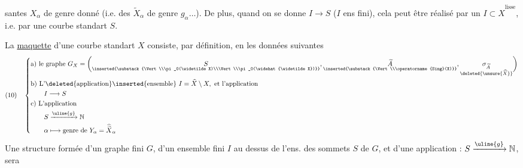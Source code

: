 santes $X_\alpha$ de genre  donné (i.e. des $\widetilde X_\alpha$ de genre $g_\alpha\ldots$). De plus, quand on se donne  $I\to S$ ($I$ ens fini), cela peut être réalisé par un $I\subset\widehat X^{\mathrm{lisse}}$, i.e. par une courbe standart $S$.

La \uline{maquette} d'une courbe standart $X$ consiste, par définition, en les données suivantes
\[
(10)\quad\left\{\begin{aligned}
&\text{a) le graphe }G_X=\biggl(
\underset{\inserted{\substack{\Vert\\\pi_0(\widetilde X)\\\Vert\\\pi_0(\widehat{\widetilde X})}}}{S},
\underset{\inserted{\substack{\Vert\\\operatorname{Sing}(X)}}}{\widetilde A},
\underset{\deleted{\unsure{\widehat X}}}{\sigma_{\widetilde A}}
\biggr)\\
&\text{b) L'}\deleted{\text{application}}\inserted{\text{ensemble}}\ I=\widehat X\setminus X,\text{ et l'application}\\
&\qquad I\longrightarrow S\\
&\text{c) L'application}\\
&\qquad S\xrightarrow{\uline{g}}\mathbb N\\
&\qquad\alpha\longmapsto\text{genre de }Y_\alpha=\widehat{\widetilde X}_\alpha
\end{aligned}\right.
\]
Une structure formée d'un graphe fini $G$, d'un ensemble fini $I$  au dessus de l'ens. des sommets $S$ de $G$, et d'une application  : $S\xrightarrow{\uline{g}}\mathbb N$, sera
